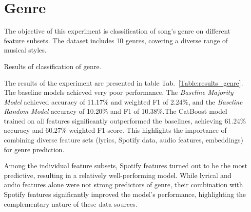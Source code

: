 \section{Genre}
\label{sec:genre}

The objective of this experiment is classification of song's genre on different
feature subsets. The dataset includes 10 genres, covering a diverse range of
musical styles.

\begin{table}[H]
\centering
\caption{Results of classification of genre.}
\label{Table:results_genre}
\end{table}

The results of the experiment are presented in table
Tab.~\ref{Table:results_genre}. The baseline models achieved very poor
performance. The \textit{Baseline Majority Model} achieved accuracy of 11.17\%
and weighted F1 of 2.24\%, and the \textit{Baseline Random Model} accuracy of
10.20\% and F1 of 10.38\%.The CatBoost model trained on all features
significantly outperformed the baselines, achieving 61.24\% accuracy and
60.27\% weighted F1-score. This highlights the importance of combining diverse
feature sets (lyrics, Spotify data, audio features, embeddings) for genre
prediction.

Among the individual feature subsets, Spotify features turned out to be the
most predictive, resulting in a relatively well-performing model. While lyrical
and audio features alone were not strong predictors of genre, their combination
with Spotify features significantly improved the model's performance,
highlighting the complementary nature of these data sources.





